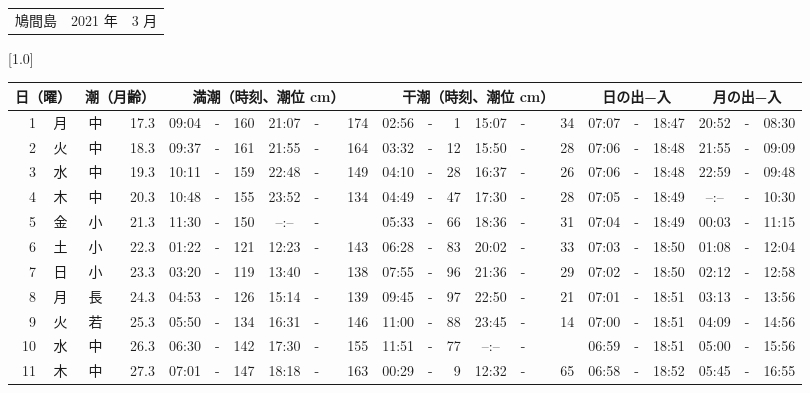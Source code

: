 \documentclass[12pt,a4j]{jsarticle}
\begin{document}
 \begin{table}[htbp]
 \begin{center}
 \begin{tabular}{lcc}
 \LARGE{鳩間島}  & \large{2021 年} & \large{ 3 月} \\
 \end{tabular}
 \end{center}
 \begin{center}
    \scalebox{0.7}[1.0]{
    \begin{tabular}{|rc|cr|ccrccr|ccrccr|ccc|ccc|}
    \hline
    \multicolumn{2}{|c|}{日（曜）} & \multicolumn{2}{c|}{潮（月齢）} & \multicolumn{6}{c|}{満潮（時刻、潮位 cm）} & \multicolumn{6}{c|}{干潮（時刻、潮位 cm）} & \multicolumn{3}{c|}{日の出−入} &  \multicolumn{3}{c|}{月の出−入}\\
 \hline
 1 & 月 & 中 & 17.3 &  09:04 &-& 160 &  21:07 &-& 174 &  02:56 &-&   1 &  15:07 &-&  34 & 07:07 & -& 18:47 & 20:52 & -& 08:30 \\
 2 & 火 & 中 & 18.3 &  09:37 &-& 161 &  21:55 &-& 164 &  03:32 &-&  12 &  15:50 &-&  28 & 07:06 & -& 18:48 & 21:55 & -& 09:09 \\
 3 & 水 & 中 & 19.3 &  10:11 &-& 159 &  22:48 &-& 149 &  04:10 &-&  28 &  16:37 &-&  26 & 07:06 & -& 18:48 & 22:59 & -& 09:48 \\
 4 & 木 & 中 & 20.3 &  10:48 &-& 155 &  23:52 &-& 134 &  04:49 &-&  47 &  17:30 &-&  28 & 07:05 & -& 18:49 & --:-- & -& 10:30 \\
 5 & 金 & 小 & 21.3 &  11:30 &-& 150 &  --:-- &-&~~~~~ &  05:33 &-&  66 &  18:36 &-&  31 & 07:04 & -& 18:49 & 00:03 & -& 11:15 \\
 6 & 土 & 小 & 22.3 &  01:22 &-& 121 &  12:23 &-& 143 &  06:28 &-&  83 &  20:02 &-&  33 & 07:03 & -& 18:50 & 01:08 & -& 12:04 \\
 7 & 日 & 小 & 23.3 &  03:20 &-& 119 &  13:40 &-& 138 &  07:55 &-&  96 &  21:36 &-&  29 & 07:02 & -& 18:50 & 02:12 & -& 12:58 \\
 8 & 月 & 長 & 24.3 &  04:53 &-& 126 &  15:14 &-& 139 &  09:45 &-&  97 &  22:50 &-&  21 & 07:01 & -& 18:51 & 03:13 & -& 13:56 \\
 9 & 火 & 若 & 25.3 &  05:50 &-& 134 &  16:31 &-& 146 &  11:00 &-&  88 &  23:45 &-&  14 & 07:00 & -& 18:51 & 04:09 & -& 14:56 \\
10 & 水 & 中 & 26.3 &  06:30 &-& 142 &  17:30 &-& 155 &  11:51 &-&  77 &  --:-- &-&~~~~~ & 06:59 & -& 18:51 & 05:00 & -& 15:56 \\
11 & 木 & 中 & 27.3 &  07:01 &-& 147 &  18:18 &-& 163 &  00:29 &-&   9 &  12:32 &-&  65 & 06:58 & -& 18:52 & 05:45 & -& 16:55 \\

\end{tabular}}
\end{center}
\end{table}
\end{document}
